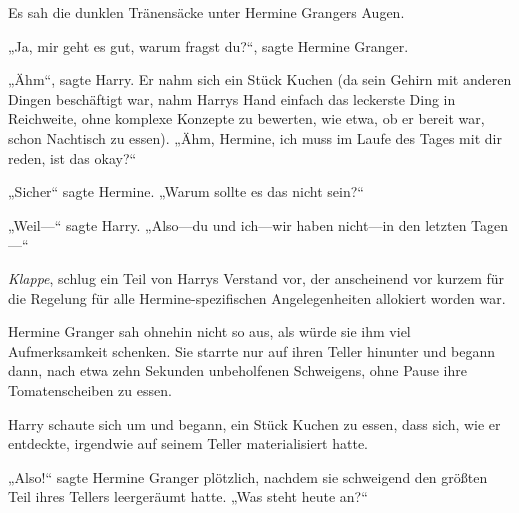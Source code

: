 Es sah die dunklen Tränensäcke unter Hermine Grangers Augen.

„Ja, mir geht es gut, warum fragst du?“, sagte Hermine Granger.

„Ähm“, sagte Harry. Er nahm sich ein Stück Kuchen (da sein Gehirn mit anderen Dingen beschäftigt war, nahm Harrys Hand einfach das leckerste Ding in Reichweite, ohne komplexe Konzepte zu bewerten, wie etwa, ob er bereit war, schon Nachtisch zu essen). „Ähm, Hermine, ich muss im Laufe des Tages mit dir reden, ist das okay?“

„Sicher“ sagte Hermine. „Warum sollte es das nicht sein?“

„Weil—“ sagte Harry. „Also—du und ich—wir haben nicht—in den letzten Tagen—“

\emph{Klappe}, schlug ein Teil von Harrys Verstand vor, der anscheinend vor kurzem für die Regelung für alle Hermine-spezifischen Angelegenheiten allokiert worden war.

Hermine Granger sah ohnehin nicht so aus, als würde sie ihm viel Aufmerksamkeit schenken. Sie starrte nur auf ihren Teller hinunter und begann dann, nach etwa zehn Sekunden unbeholfenen Schweigens, ohne Pause ihre Tomatenscheiben zu essen.

Harry schaute sich um und begann, ein Stück Kuchen zu essen, dass sich, wie er entdeckte, irgendwie auf seinem Teller materialisiert hatte.

„Also!“ sagte Hermine Granger plötzlich, nachdem sie schweigend den größten Teil ihres Tellers leergeräumt hatte. „Was steht heute an?“

